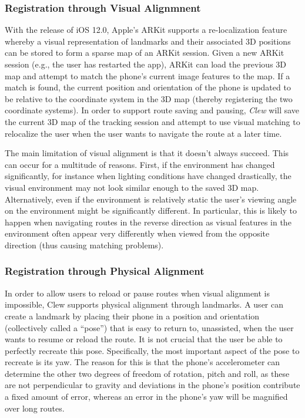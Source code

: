 \documentclass[chi_draft]{sigchi}
\begin{document}
\subsubsection{Registration through Visual Alignmnent}
With the release of iOS 12.0, Apple's ARKit supports a re-localization feature whereby a visual representation of landmarks and their associated 3D positions can be stored to form a sparse map of an ARKit session.  Given a new ARKit session (e.g., the user has restarted the app), ARKit can load the previous 3D map and attempt to match the phone's current image features to the map.  If a match is found, the current position and orientation of the phone is updated to be relative to the coordinate system in the 3D map (thereby registering the two coordinate systems).  In order to support route saving and pausing, \emph{Clew} will save the current 3D map of the tracking session and attempt to use visual matching to relocalize the user when the user wants to navigate the route at a later time.

The main limitation of visual alignment is that it doesn't always succeed.  This can occur for a multitude of reasons.  First, if the environment has changed significantly, for instance when lighting conditions have changed drastically, the visual environment may not look similar enough to the saved 3D map.  Alternatively, even if the environment is relatively static the user's viewing angle on the environment might be significantly different.  In particular, this is likely to happen when navigating routes in the reverse direction as visual features in the environment often appear very differently when viewed from the opposite direction (thus causing matching problems).


\subsubsection{Registration through Physical Alignment}

In order to allow users to reload or pause routes when visual alignment is impossible, Clew supports physical alignment through landmarks.  A user can create a landmark by placing their phone in a position and orientation (collectively called a ``pose'') that is easy to return to, unassisted, when the user wants to resume or reload the route.  It is not crucial that the user be able to perfectly recreate this pose.  Specifically, the most important aspect of the pose to recreate is its yaw.  The reason for this is that the phone's accelerometer can determine the other two degrees of freedom of rotation, pitch and roll, as these are not perpendicular to gravity and deviations in the phone's position contribute a fixed amount of error, whereas an error in the phone's yaw will be magnified over long routes.
\end{document}
